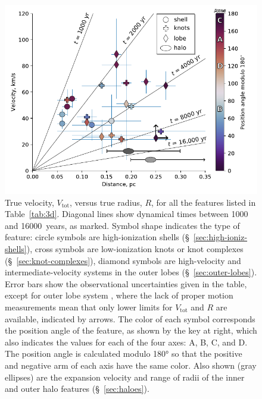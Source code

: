 \documentclass[useAMS, usenatbib]{mnras}
\begin{document}
\begin{figure}
  \includegraphics[width=\linewidth]
  {figs/vel-radius-systems-annotated}
  \caption{
    True velocity, \(V_{\text{tot}}\), versus true radius, \(R\), for all the features listed in Table~\ref{tab:3d}.
    Diagonal lines show dynamical times between \num{1000} and \SI{16000}{years}, as marked.
    Symbol shape indicates the type of feature:
    circle symbols are high-ionization shells (\S~\ref{sec:high-ioniz-shells}),
    cross symbols are low-ionization knots or knot complexes (\S~\ref{sec:knot-complexes}),
    diamond symbols are high-velocity and intermediate-velocity systems in the outer lobes (\S~\ref{sec:outer-lobes}).
    Error bars show the observational uncertainties given in the table,
    except for outer lobe system , where the lack of proper motion measurements mean that only lower limits for \(V_{\text{tot}}\) and \(R\) are available, indicated by arrows.
    The color of each symbol corresponds the position angle of the feature, as shown by the key at right,
    which also indicates the values for each of the four axes: A, B, C, and D.
    The position angle is calculated modulo \ang{180} so that the positive and negative arm of each axis have the same color.
    Also shown (gray ellipses) are the expansion velocity and range of radii of the inner and outer halo features (\S~\ref{sec:haloes}).
  }
  \label{fig:ages}
\end{figure}
\end{document}
